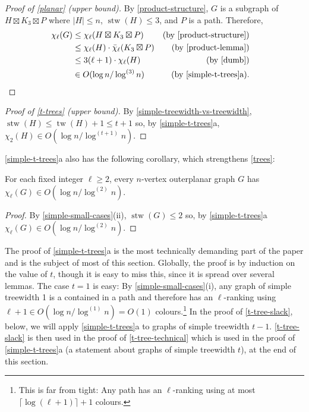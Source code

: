 \documentclass[kpfonts]{patmorin}
\DeclareMathOperator{\tw}{tw}
\DeclareMathOperator{\stw}{stw}
\newcommand{\trn}{\chi_2}
\newcommand{\lrn}{\chi_{\ell}}
\newcommand{\dlcn}{\bar{\chi}_\ell}
\theoremstyle{named}
\newcommand{\weirdref}[2]{\cref{#1}#2}
\begin{document}
\begin{proof}[Proof of \cref{planar} (upper bound)]
    By \cref{product-structure}, $G$ is a subgraph of $H\boxtimes K_3\boxtimes P$ where $|H|\le n$, $\stw(H)\le 3$, and $P$ is a path. Therefore,
    \begin{align*}
        \lrn(G) & \le \lrn(H\boxtimes K_3\boxtimes P)
                    & \text{(by \cref{product-structure})}\\
                & \le \lrn(H)\cdot \dlcn(K_3\boxtimes P)
                    & \text{(by \cref{product-lemma})} \\
                & \le 3(\ell+1)\cdot\lrn(H) & \text{(by \cref{dumb})} \\
                & \in O(\log n/\log^{(3)} n) & \text{(by \weirdref{simple-t-trees}{a}).} & \qedhere
    \end{align*}
\end{proof}

\begin{proof}[Proof of \cref{t-trees} (upper bound)]
    By \cref{simple-treewidth-vs-treewidth}, $\stw(H)\le\tw(H)+1\le t+1$ so, by   \weirdref{simple-t-trees}{a}, $\trn(H)\in O(\log n/\log^{(t+1)}n)$.
\end{proof}

\weirdref{simple-t-trees}{a} also has the following corollary, which strengthens \cref{trees}:

\begin{cor}\label{outerplanar}
    For each fixed integer $\ell\ge 2$, every $n$-vertex outerplanar graph $G$ has $\lrn(G)\in O(\log n/\log^{(2)} n)$.
\end{cor}

\begin{proof}
    By \cref{simple-small-cases}{(ii)}, $\stw(G)\le 2$ so, by \weirdref{simple-t-trees}{a} $\lrn(G)\in O(\log n/\log^{(2)} n)$.
\end{proof}

The proof of \weirdref{simple-t-trees}{a} is the most technically demanding part of the paper and is the subject of most of this section.  Globally, the proof is by induction on the value of $t$, though it is easy to miss this, since it is spread over several lemmas. The case $t=1$ is easy: By \cref{simple-small-cases}(i), any graph of simple treewidth 1 is a contained in a path and therefore has an $\ell$-ranking using $\ell+1\in O(\log n/\log^{(1)} n) = O(1)$ colours.\footnote{\label{logarithmic-base-case}This is far from tight: Any path has an $\ell$-ranking using at most $\lceil\log(\ell+1)\rceil+1$ colours.}  In the proof of \cref{t-tree-slack}, below, we will apply \weirdref{simple-t-trees}{a} to graphs of simple treewidth $t-1$. \cref{t-tree-slack} is then used in the proof of \cref{t-tree-technical} which is used in the proof of \weirdref{simple-t-trees}{a} (a statement about graphs of simple treewidth $t$), at the end of this section.
\end{document}
